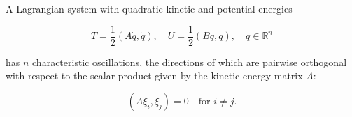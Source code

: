 A Lagrangian system with quadratic kinetic and potential energies

$$T = \frac{1}{2}(A \dot{q}, \dot{q}), \quad U = \frac{1}{2}(B q, q), \quad q \in \mathbb{R}^n$$

has $n$ characteristic oscillations, the directions of which are pairwise orthogonal with respect to the scalar product given by the kinetic energy matrix $A$:

$$(A \xi_i, \xi_j) = 0 \quad \text{for } i \neq j.$$
